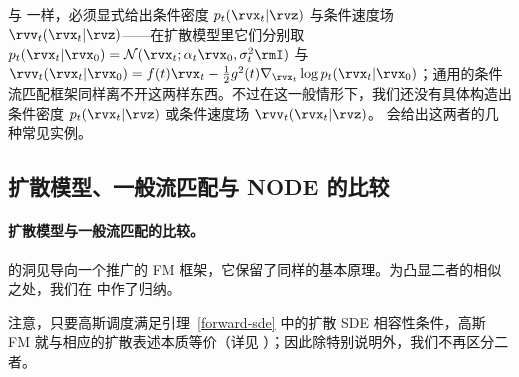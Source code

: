 与  一样，必须显式给出条件密度 $p_t(\rvx_t|\rvz)$ 与条件速度场 $\rvv_t(\rvx_t|\rvz)$——在扩散模型里它们分别取 $p_t(\rvx_t|\rvx_0) = \mathcal{N}(\rvx_t; \alpha_t \rvx_0, \sigma_t^2 \rmI)$ 与 $\rvv_t(\rvx_t|\rvx_0) = f(t)\rvx_t - \frac{1}{2}g^2(t)\nabla_{\rvx_t} \log p_t(\rvx_t|\rvx_0)$；通用的条件流匹配框架同样离不开这两样东西。不过在这一般情形下，我们还没有具体构造出条件密度 $p_t(\rvx_t|\rvz)$ 或条件速度场 $\rvv_t(\rvx_t|\rvz)$。 会给出这两者的几种常见实例。


\subsection{扩散模型、一般流匹配与 NODE 的比较}\label{subsec:compare-dm-general-fm}


\paragraph{扩散模型与一般流匹配的比较。}
 的洞见导向一个推广的 FM 框架，它保留了同样的基本原理。为凸显二者的相似之处，我们在  中作了归纳。


\begin{table}[th]
\caption{扩散模型（即高斯 FM）与通用 FM 框架的比较。
这里的通用 FM 框架指采用双侧条件化的设定，其中 $\mathbf{x}_0 \sim p_{\text{src}}$ 与 $\mathbf{x}_1 \sim p_{\text{tgt}}$ 独立采样。}
\label{tab:framework_comparison}
\centering
{}
\end{table}
注意，只要高斯调度满足引理~\ref{forward-sde} 中的扩散 SDE 相容性条件，高斯 FM 就与相应的扩散表述本质等价（详见 ）；因此除特别说明外，我们不再区分二者。

